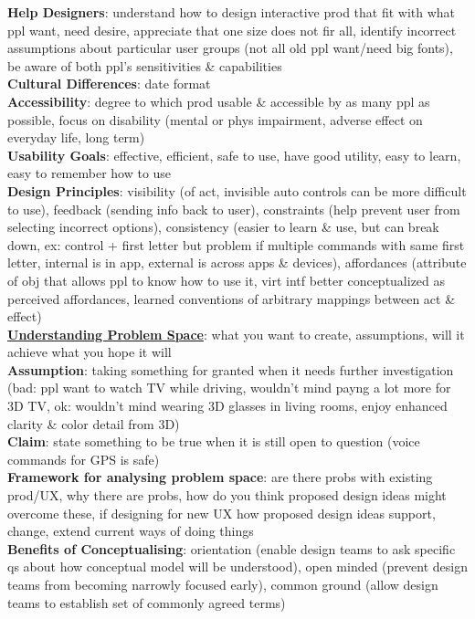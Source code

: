 \documentclass[a4paper]{article}
\begin{document}
\begin{multicols}{3}
        \textbf{Help Designers}: understand how to design interactive prod that fit with what ppl want, need desire, appreciate that one size does not fir all, identify incorrect assumptions about particular user groups (not all old ppl want/need big fonts), be aware of both ppl's sensitivities \& capabilities\\
        \textbf{Cultural Differences}: date format\\
        \textbf{Accessibility}: degree to which prod usable \& accessible by as many ppl as possible, focus on disability (mental or phys impairment, adverse effect on everyday life, long term)\\
        \textbf{Usability Goals}: effective, efficient, safe to use, have good utility, easy to learn, easy to remember how to use\\
        \textbf{Design Principles}: visibility (of act, invisible auto controls can be more difficult to use), feedback (sending info back to user), constraints (help prevent user from selecting incorrect options), consistency (easier to learn \& use, but can break down, ex: control + first letter but problem if multiple commands with same first letter, internal is in app, external is across apps \& devices), affordances (attribute of obj that allows ppl to know how to use it, virt intf better conceptualized as perceived affordances, learned conventions of arbitrary mappings between act \& effect)\\
        \underline{\textbf{Understanding Problem Space}}: what you want to create, assumptions, will it achieve what you hope it will\\
        \textbf{Assumption}: taking something for granted when it needs further investigation (bad: ppl want to watch TV while driving, wouldn't mind payng a lot more for 3D TV, ok: wouldn't mind wearing 3D glasses in living rooms, enjoy enhanced clarity \& color detail from 3D)\\
        \textbf{Claim}: state something to be true when it is still open to question (voice commands for GPS is safe)\\
        \textbf{Framework for analysing problem space}: are there probs with existing prod/UX, why there are probs, how do you think proposed design ideas might overcome these, if designing for new UX how proposed design ideas support, change, extend current ways of doing things\\
        \textbf{Benefits of Conceptualising}: orientation (enable design teams to ask specific qs about how conceptual model will be understood), open minded (prevent design teams from becoming narrowly focused early), common ground (allow design teams to establish set of commonly agreed terms)\\

\end{multicols}
\end{document}
